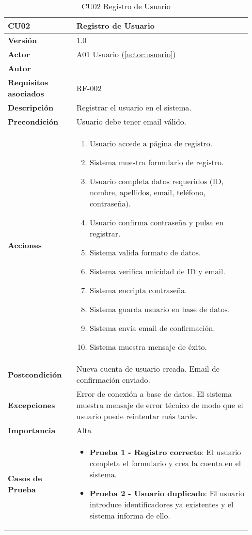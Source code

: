 \begin{table}[H]
	\centering
	\begin{tabularx}{\linewidth}{ p{} p{} }
		\toprule
		\textbf{CU02}    & \textbf{Registro de Usuario} \\
		\toprule
		\textbf{Versión}              & 1.0    \\
		\textbf{Actor}                & A01 Usuario (\ref{actor:usuario}) \\
		\textbf{Autor}                & \nombre \\
		\textbf{Requisitos asociados} & RF-002 \\
		\textbf{Descripción}          & Registrar el usuario en el sistema. \\
		\textbf{Precondición}         & Usuario debe tener email válido. \\
		\textbf{Acciones}             &
		\begin{enumerate}
			\def\labelenumi{\arabic{enumi}.}
			\tightlist
			\item Usuario accede a página de registro.
            \item Sistema muestra formulario de registro.
            \item Usuario completa datos requeridos (ID, nombre, apellidos, email, teléfono, contraseña).
            \item Usuario confirma contraseña y pulsa en registrar.
            \item Sistema valida formato de datos.
            \item Sistema verifica unicidad de ID y email.
            \item Sistema encripta contraseña.
            \item Sistema guarda usuario en base de datos.
            \item Sistema envía email de confirmación.
            \item Sistema muestra mensaje de éxito.
		\end{enumerate}\\
		\textbf{Postcondición}        & Nueva cuenta de usuario creada. Email de confirmación enviado.\\
		\textbf{Excepciones}          & Error de conexión a base de datos. El sistema muestra mensaje de error técnico de modo que el usuario puede reintentar más tarde.\\
		\textbf{Importancia}          & Alta \\
		\textbf{Casos de Prueba}      &
		\begin{itemize}
			\item \textbf{Prueba 1 - Registro correcto}: El usuario completa el formulario y crea la cuenta en el sistema.
			\item \textbf{Prueba 2 - Usuario duplicado}: El usuario introduce identificadores ya existentes y el sistema informa de ello.
		\end{itemize} \\
		\bottomrule
	\end{tabularx}
	\caption{CU02 Registro de Usuario}
	\label{cu:registro-usuario}
\end{table}

